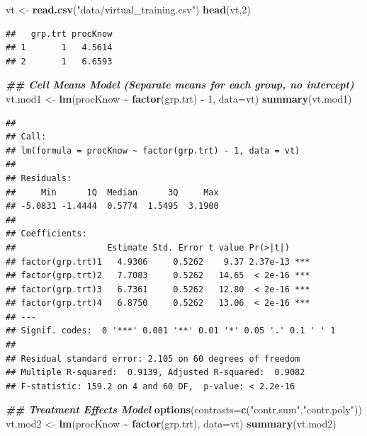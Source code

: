 \documentclass[
]{book}
\newenvironment{Shaded}{\begin{snugshade}}{\end{snugshade}}
\newcommand{\AttributeTok}[1]{\textcolor[rgb]{0.13,0.29,0.53}{#1}}
\newcommand{\DecValTok}[1]{\textcolor[rgb]{0.00,0.00,0.81}{#1}}
\newcommand{\DocumentationTok}[1]{\textcolor[rgb]{0.56,0.35,0.01}{\textbf{\textit{#1}}}}
\newcommand{\FunctionTok}[1]{\textcolor[rgb]{0.13,0.29,0.53}{\textbf{#1}}}
\newcommand{\NormalTok}[1]{#1}
\newcommand{\OtherTok}[1]{\textcolor[rgb]{0.56,0.35,0.01}{#1}}
\newcommand{\SpecialCharTok}[1]{\textcolor[rgb]{0.81,0.36,0.00}{\textbf{#1}}}
\newcommand{\StringTok}[1]{\textcolor[rgb]{0.31,0.60,0.02}{#1}}
\begin{document}
\begin{Shaded}
\begin{Highlighting}[]
\NormalTok{vt }\OtherTok{\textless{}{-}} \FunctionTok{read.csv}\NormalTok{(}\StringTok{"data/virtual\_training.csv"}\NormalTok{)}
\FunctionTok{head}\NormalTok{(vt,}\DecValTok{2}\NormalTok{)}
\end{Highlighting}
\end{Shaded}

\begin{verbatim}
##   grp.trt procKnow
## 1       1   4.5614
## 2       1   6.6593
\end{verbatim}

\begin{Shaded}
\begin{Highlighting}[]
\DocumentationTok{\#\# Cell Means Model (Separate means for each group, no intercept)}
\NormalTok{vt.mod1 }\OtherTok{\textless{}{-}} \FunctionTok{lm}\NormalTok{(procKnow }\SpecialCharTok{\textasciitilde{}} \FunctionTok{factor}\NormalTok{(grp.trt) }\SpecialCharTok{{-}} \DecValTok{1}\NormalTok{, }\AttributeTok{data=}\NormalTok{vt)}
\FunctionTok{summary}\NormalTok{(vt.mod1)}
\end{Highlighting}
\end{Shaded}

\begin{verbatim}
## 
## Call:
## lm(formula = procKnow ~ factor(grp.trt) - 1, data = vt)
## 
## Residuals:
##     Min      1Q  Median      3Q     Max 
## -5.0831 -1.4444  0.5774  1.5495  3.1900 
## 
## Coefficients:
##                  Estimate Std. Error t value Pr(>|t|)    
## factor(grp.trt)1   4.9306     0.5262    9.37 2.37e-13 ***
## factor(grp.trt)2   7.7083     0.5262   14.65  < 2e-16 ***
## factor(grp.trt)3   6.7361     0.5262   12.80  < 2e-16 ***
## factor(grp.trt)4   6.8750     0.5262   13.06  < 2e-16 ***
## ---
## Signif. codes:  0 '***' 0.001 '**' 0.01 '*' 0.05 '.' 0.1 ' ' 1
## 
## Residual standard error: 2.105 on 60 degrees of freedom
## Multiple R-squared:  0.9139, Adjusted R-squared:  0.9082 
## F-statistic: 159.2 on 4 and 60 DF,  p-value: < 2.2e-16
\end{verbatim}

\begin{Shaded}
\begin{Highlighting}[]
\DocumentationTok{\#\# Treatment Effects Model}
\FunctionTok{options}\NormalTok{(}\AttributeTok{contrasts=}\FunctionTok{c}\NormalTok{(}\StringTok{"contr.sum"}\NormalTok{,}\StringTok{"contr.poly"}\NormalTok{))}
\NormalTok{vt.mod2 }\OtherTok{\textless{}{-}} \FunctionTok{lm}\NormalTok{(procKnow }\SpecialCharTok{\textasciitilde{}} \FunctionTok{factor}\NormalTok{(grp.trt), }\AttributeTok{data=}\NormalTok{vt)}
\FunctionTok{summary}\NormalTok{(vt.mod2)}
\end{Highlighting}
\end{Shaded}
\end{document}
